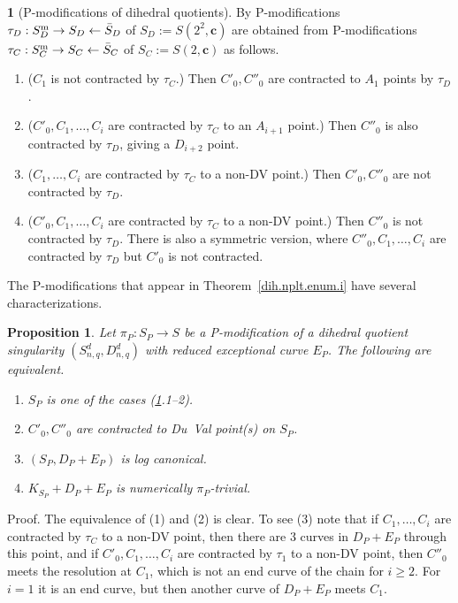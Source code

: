 \documentclass{amsart}
\newtheorem{prop}[thm]{Proposition}
\theoremstyle{definition}
\newtheorem{say}[thm]{}
\theoremstyle{remark}
\begin{document}
\begin{say}[P-modifications of dihedral quotients]\label{dih.P.mod.all}  By \cite{MR1129040, MR1213355}
  P-modifications $\tau_D: S_D^{\rm m}\to S_D\leftarrow \bar S_D$ of $S_D:=S(2^2, {\mathbf c})$ are obtained from
  P-modifications  $\tau_C: S_C^{\rm m}\to S_C\leftarrow \bar S_C$ of  $S_C:=S(2, {\mathbf c})$ as follows.
    \begin{enumerate}
  \item ($C_1$ is not contracted by $\tau_C$.)  Then  $C'_0, C''_0$ are  contracted to  $A_1$ points by $\tau_D$.
  \item ($C'_0,C_1, \dots, C_i$ are contracted by $\tau_C$ to an $A_{i+1}$ point.)  Then  $C''_0$ is also  contracted  by $\tau_D$, giving a  $D_{i+2}$ point.
    \item ($C_1, \dots, C_i$ are contracted by $\tau_C$ to a non-DV point.)  Then  $C'_0, C''_0$ are  not contracted   by $\tau_D$.
    \item ($C'_0, C_1, \dots, C_i$ are contracted by $\tau_C$ to a non-DV point.)  Then  $C''_0$ is  not contracted  by $\tau_D$. There is also a symmetric version, where
      $C''_0,C_1, \dots, C_i$ are contracted by $\tau_D$ but $C'_0$ is  not contracted.
    \end{enumerate}
    \end{say}


  The P-modifications that appear in Theorem~\ref{dih.nplt.enum.i}  have several characterizations.


  \begin{prop} \label{DP.char.lem}
    Let $\pi_P:S_P\to S$ be a P-modification of a dihedral quotient singularity
    $(S^d_{n,q}, D^d_{n,q})$ with reduced exceptional curve $E_P$. The following are equivalent.
    \begin{enumerate}
    \item $S_P$ is one of the  cases (\ref{dih.P.mod.all}.1--2).
      \item $C'_0, C''_0$ are contracted to  Du~Val point(s) on $S_P$.
     \item   $(S_P, D_P+E_P)$ is log canonical. 
  \item   $K_{S_P}+D_P+E_P$ is numerically $\pi_P$-trivial.
    \end{enumerate}
\end{prop}

  Proof.  The equivalence of (1) and (2) is clear.
  To see (3) note that if $C_1, \dots, C_i$ are contracted by $\tau_C$ to a non-DV point, then there are 3 curves in $D_P+E_P$ through this point, and if
  $C'_0, C_1, \dots, C_i$ are contracted by $\tau_1$ to a non-DV point, then
  $C''_0$ meets the resolution at $C_1$, which is not  an end curve  of
  the chain for $i\geq 2$. For $i=1$ it is an  end curve,  but then another curve of $D_P+E_P$ meets $C_1$.
\end{document}

